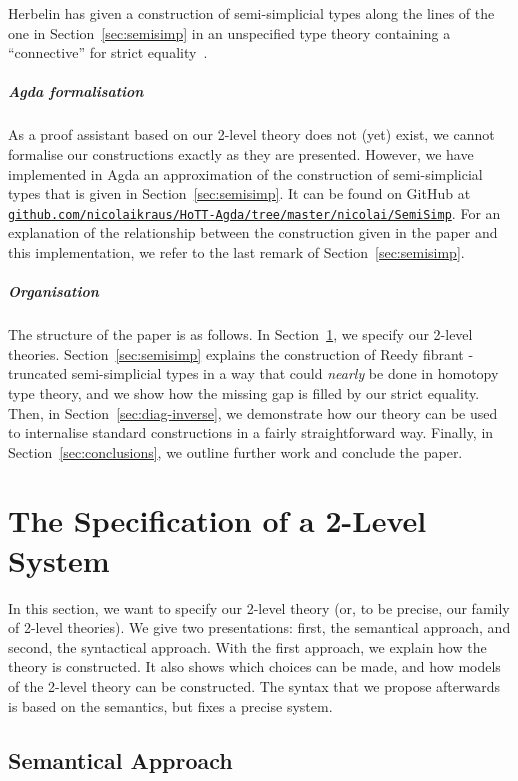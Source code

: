 \documentclass[a4paper,reqno]{amsart}
\theoremstyle{plain}
\theoremstyle{definition}
\begin{document}
Herbelin has given a construction of semi-simplicial types along the lines of the one in Section~\ref{sec:semisimp} in an unspecified type theory containing a ``connective'' for strict equality~\cite{herbelin_semisimpl}.



\subparagraph*{\textsf{Agda} formalisation}
As a proof assistant based on our 2-level theory does not (yet) exist, we cannot formalise our constructions exactly as they are presented.
However, we have implemented in Agda an approximation of the construction of semi-simplicial types that is given in Section~\ref{sec:semisimp}.
It can be found on GitHub at \href{https://github.com/nicolaikraus/HoTT-Agda/blob/master/nicolai/SemiSimp/SStypes.agda}{\nolinkurl{github.com/nicolaikraus/HoTT-Agda/tree/master/nicolai/SemiSimp}}.
For an explanation of the relationship between the construction given in the paper and this implementation, we refer to the last remark of Section~\ref{sec:semisimp}.

\subparagraph*{Organisation}
The structure of the paper is as follows.
In Section~\ref{sec:specification}, we specify our 2-level theories.
Section~\ref{sec:semisimp} explains the construction of Reedy fibrant -truncated semi-simplicial types in a way that could \emph{nearly} be done in homotopy type theory, and we show how the missing gap is filled by our strict equality.
Then, in Section~\ref{sec:diag-inverse}, we demonstrate how our theory can be used to internalise standard constructions in a fairly straightforward way. 
Finally, in 
Section~\ref{sec:conclusions}, we outline further work and conclude the paper. 


\section{The Specification of a 2-Level System} \label{sec:specification}

In this section, we want to specify our 2-level theory (or, to be precise, our family of 2-level theories). 
We give two presentations: first, the semantical approach, and second, the syntactical approach.
With the first approach, we explain how the theory is constructed.
It also shows which choices can be made, and how models of the 2-level theory can be constructed.
The syntax that we propose afterwards is based on the semantics, but fixes a precise system.

\subsection{Semantical Approach}
\end{document}
